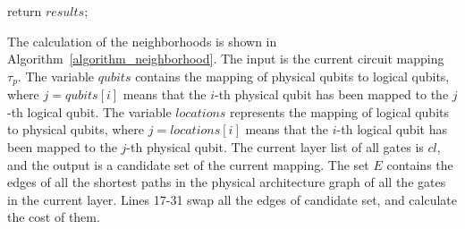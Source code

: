 \documentclass[runningheads]{llncs}
\begin{document}
\begin{algorithm}
					return $results$;
	\end{algorithm}

The calculation of the neighborhoods is shown in Algorithm~\ref{algorithm_neighborhood}. The input is the current circuit mapping $\tau_{p}$. The variable $qubits$ contains the mapping of physical qubits to logical qubits, where $ j = qubits [i] $ means that the $i$-th physical qubit has been mapped to the $j$-th logical qubit. The variable $ locations $ represents the mapping of logical qubits to physical qubits, where $ j = locations [i] $ means that the $i$-th logical qubit has been mapped to the $j$-th physical qubit.
The current layer list of all gates is $cl$, and the output is a candidate set of the current mapping. The set $E$ contains the edges of all the shortest paths in the physical architecture graph of all the gates in the current layer. Lines 17-31 swap all the edges of candidate set, and calculate the cost of them.
\end{document}
